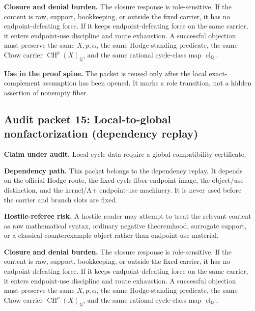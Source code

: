 \documentclass[11pt]{article}
\newcommand{\QQ}{\mathbb{Q}}
\newcommand{\CH}{\operatorname{CH}}
\newcommand{\clQ}{\operatorname{cl}_{\QQ}}
\begin{document}
\par\noindent\textbf{Closure and denial burden.} The closure response is role-sensitive. If the content is raw, support, bookkeeping, or outside the fixed carrier, it has no endpoint-defeating force. If it keeps endpoint-defeating force on the same carrier, it enters endpoint-use discipline and route exhaustion. A successful objection must preserve the same $X,p,\alpha$, the same Hodge-standing predicate, the same Chow carrier $\CH^p(X)_\QQ$, and the same rational cycle-class map $\clQ$.


\par\noindent\textbf{Use in the proof spine.} The packet is reused only after the local exact-complement assumption has been opened. It marks a role transition, not a hidden assertion of nonempty fiber.


\subsection{Audit packet 15: Local-to-global nonfactorization (dependency replay)}


\par\noindent\textbf{Claim under audit.} Local cycle data require a global compatibility certificate.


\par\noindent\textbf{Dependency path.} This packet belongs to the dependency replay. It depends on the official Hodge route, the fixed cycle-fiber endpoint image, the object/use distinction, and the kernel/A+ endpoint-use machinery. It is never used before the carrier and branch slots are fixed.


\par\noindent\textbf{Hostile-referee risk.} A hostile reader may attempt to treat the relevant content as raw mathematical syntax, ordinary negative theoremhood, surrogate support, or a classical counterexample object rather than endpoint-use material.


\par\noindent\textbf{Closure and denial burden.} The closure response is role-sensitive. If the content is raw, support, bookkeeping, or outside the fixed carrier, it has no endpoint-defeating force. If it keeps endpoint-defeating force on the same carrier, it enters endpoint-use discipline and route exhaustion. A successful objection must preserve the same $X,p,\alpha$, the same Hodge-standing predicate, the same Chow carrier $\CH^p(X)_\QQ$, and the same rational cycle-class map $\clQ$.
\end{document}
